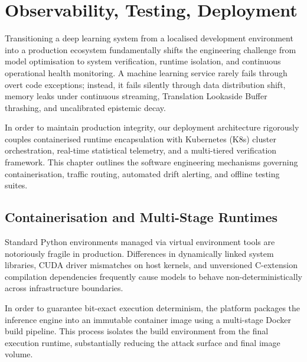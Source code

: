 \chapter{Observability, Testing, Deployment}
\label{ch:observability}

Transitioning a deep learning system from a localised development environment into a production ecosystem fundamentally shifts the engineering challenge from model optimisation to system verification, runtime isolation, and continuous operational health monitoring. A machine learning service rarely fails through overt code exceptions; instead, it fails silently through data distribution shift, memory leaks under continuous streaming, Translation Lookaside Buffer thrashing, and uncalibrated epistemic decay.

In order to maintain production integrity, our deployment architecture rigorously couples containerised runtime encapsulation with Kubernetes (K8s) cluster orchestration, real-time statistical telemetry, and a multi-tiered verification framework. This chapter outlines the software engineering mechanisms governing containerisation, traffic routing, automated drift alerting, and offline testing suites.

\section{Containerisation and Multi-Stage Runtimes}
\label{sec:containerization}

Standard Python environments managed via virtual environment tools are notoriously fragile in production. Differences in dynamically linked system libraries, CUDA driver mismatches on host kernels, and unversioned C-extension compilation dependencies frequently cause models to behave non-deterministically across infrastructure boundaries.

In order to guarantee bit-exact execution determinism, the platform packages the inference engine into an immutable container image using a multi-stage Docker build pipeline. This process isolates the build environment from the final execution runtime, substantially reducing the attack surface and final image volume.

